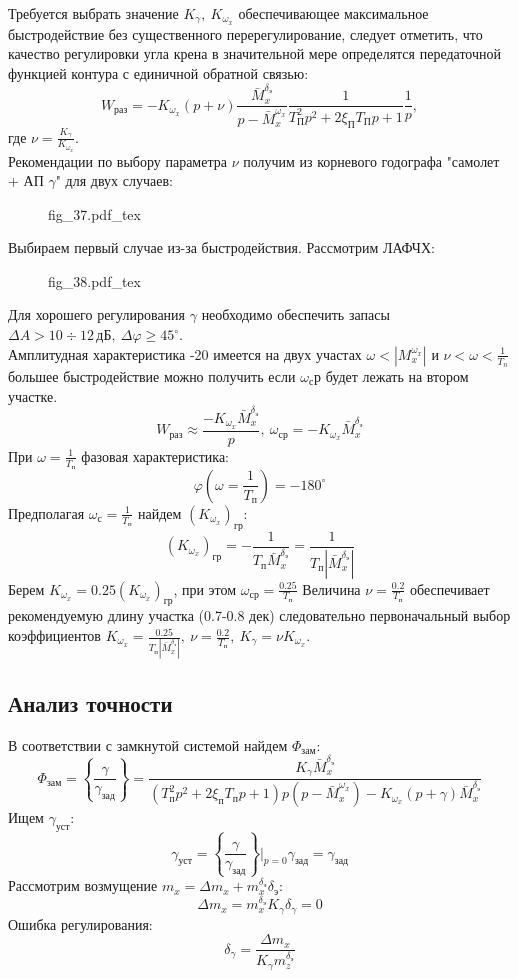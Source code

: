 \documentclass{article}
\begin{document}
Требуется выбрать значение $K_\gamma, \ K_{\omega_x}$ обеспечивающее максимальное быстродействие без существенного перерегулирование, следует отметить, что качество регулировки угла крена в значительной мере определятся передаточной функцией контура с единичной обратной связью: 
\[
W_{раз} = -K_{\omega_x} (p + \nu)\frac{\bar{M}_x^{\delta_э}}{p -\bar{M}_x^{\omega_x}}\frac{1}{T_П^2 p^2 + 2 \xi_П T_П p + 1}\frac{1}{p},
\]
где $\nu = \frac{K_\gamma}{K_{\omega_x}}$.\\
Рекомендации по выбору параметра $\nu$ получим из корневого годографа "самолет + АП $\gamma$" для двух случаев:

\begin{figure}[H]
{fig_37.pdf_tex}
\end{figure}
Выбираем первый случае из-за быстродействия. 
Рассмотрим ЛАФЧХ:
\begin{figure}[H]
{fig_38.pdf_tex}
\end{figure}

Для хорошего регулирования $\gamma$ необходимо обеспечить запасы $\Delta A > 10 \div 12 \, дБ,\ \Delta \varphi \geq 45^\circ$.\\
Амплитудная характеристика -20 имеется на двух участах $\omega < |M_x^{\omega_x}|$ и $\nu < \omega <\frac{1}{T_n}$ большее быстродействие можно получить если $\omega_ср$ будет лежать на втором участке.
\[
W_{раз} \approx \frac{-K_{\omega_x} \bar{M}_x^{\delta_э}}{p},\ \omega_{ср} = -K_{\omega_x} \bar{M}_x^{\delta_э}
\]
При $\omega = \frac{1}{T_п}$ фазовая характеристика:
\[
\varphi(\omega=\frac{1}{T_п}) = -180^\circ
\]
Предполагая $\omega_с = \frac{1}{T_п}$ найдем $(K_{\omega_x})_{гр}$:
\[
(K_{\omega_x})_{гр} = -\frac{1}{T_п \bar{M}_x^{\delta_э}} = \frac{1}{T_п |\bar{M}_x^{\delta_э}|}
\]
Берем $K_{\omega_x} = 0.25(K_{\omega_x})_{гр}$, при этом $\omega_{ср} = \frac{0.25}{T_п}$	
Величина $\nu =\frac{0.2}{T_п}$ обеспечивает рекомендуемую длину участка (0.7-0.8 дек) следовательно первоначальный выбор коэффициентов $K_{\omega_x} =\frac{0.25}{T_п |\bar{M}_x^{\delta_э}|}, \ \nu= \frac{0.2}{T_п},\ K_\gamma = \nu K_{\omega_x}$.

\subsection{Анализ точности}
В соответствии с замкнутой системой найдем $\Phi_{зам}$:
\[
\Phi_{зам} =\left\{\frac{\gamma}{\gamma_{зад}}\right\} = \frac{K_\gamma \bar{M}_x^{\delta_э}}{(T_п^2 p^2 + 2 \xi_п T_п p + 1)p(p - \bar{M}_x^{\omega_x}) - K_{\omega_x}(p + \gamma)\bar{M}_x^{\delta_э}} 
\]
Ищем $\gamma_{уст}$:
\[ \gamma_{уст} = \left\{\frac{\gamma}{\gamma_{зад}}\right\}\Big|_{p = 0} \gamma_{зад} = \gamma_{зад} \]
Рассмотрим возмущение $m_x = \Delta m_x + m_x^{\delta_э} \delta_э$:
\[
\Delta m_x = m_x^{\delta_э} K_\gamma \delta_\gamma = 0
\]
Ошибка регулирования:
\[
\delta_\gamma =\frac{\Delta m_x}{K_\gamma m_z^{\delta_э}} 
\]
\end{document}
